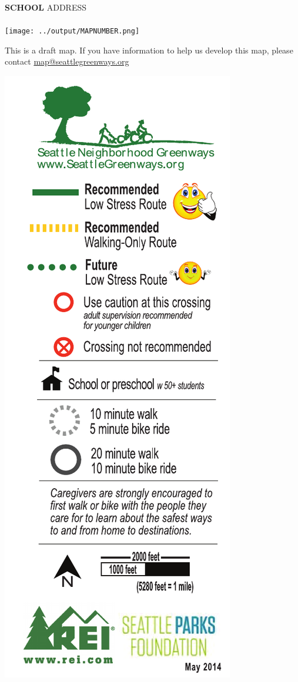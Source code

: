 \clearpage
\begin{minipage}{.69\textwidth}
\hspace{.05in}\textbf{SCHOOL}\hfill
\hfill ADDRESS \hspace{.01in} \\
\vspace{-4mm} \\
\texttt{[image: ../output/MAPNUMBER.png]} \\
\scriptsize
\centerline{
This is a draft map. If you have information to help us develop this map, please contact \href{mailto:map@seattlegreenways.org}{map@seattlegreenways.org}}
\normalsize
\end{minipage}
\begin{minipage}{.29\textwidth}
\includegraphics[width=.96\textwidth]{../src/legend.pdf}
\end{minipage}
